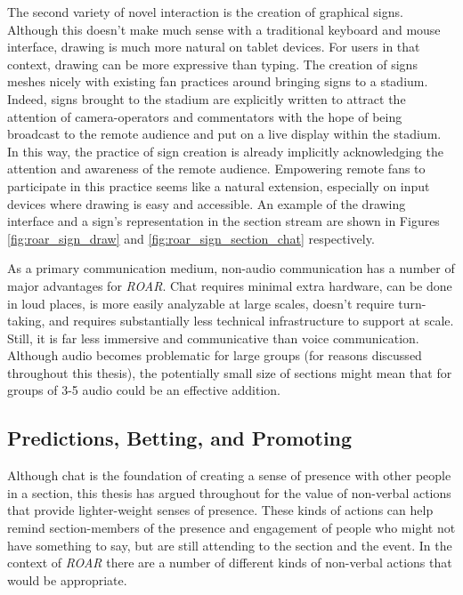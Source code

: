 The second variety of novel interaction is the creation of graphical signs. Although this doesn't make much sense with a traditional keyboard and mouse interface, drawing is much more natural on tablet devices. For users in that context, drawing can be more expressive than typing. The creation of signs meshes nicely with existing fan practices around bringing signs to a stadium. Indeed, signs brought to the stadium are explicitly written to attract the attention of camera-operators and commentators with the hope of being broadcast to the remote audience and put on a live display within the stadium. In this way, the practice of sign creation is already implicitly acknowledging the attention and awareness of the remote audience. Empowering remote fans to participate in this practice seems like a natural extension, especially on input devices where drawing is easy and accessible. An example of the drawing interface and a sign's representation in the section stream are shown in Figures \ref{fig:roar_sign_draw} and \ref{fig:roar_sign_section_chat} respectively.


As a primary communication medium, non-audio communication has a number of major advantages for \emph{ROAR}. Chat requires minimal extra hardware, can be done in loud places, is more easily analyzable at large scales, doesn't require turn-taking, and requires substantially less technical infrastructure to support at scale. Still, it is far less immersive and communicative than voice communication. Although audio becomes problematic for large groups (for reasons discussed throughout this thesis), the potentially small size of sections might mean that for groups of 3-5 audio could be an effective addition.


\subsection{Predictions, Betting, and Promoting}

Although chat is the foundation of creating a sense of presence with other people in a section, this thesis has argued throughout for the value of non-verbal actions that provide lighter-weight senses of presence. These kinds of actions can help remind section-members of the presence and engagement of people who might not have something to say, but are still attending to the section and the event. In the context of \emph{ROAR} there are a number of different kinds of non-verbal actions that would be appropriate.

